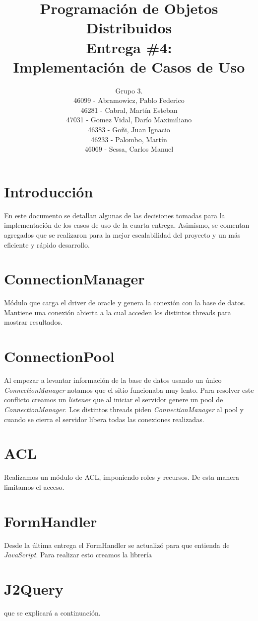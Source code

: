 \documentclass[a4paper,11pt]{article}
\title{
        Programación de Objetos Distribuidos \\
        Entrega \#4: \\
        Implementación de Casos de Uso
    }
\author{
        Grupo 3. \\
        46099 - Abramowicz, Pablo Federico \\
        46281 - Cabral, Martín Esteban \\
        47031 - Gomez Vidal, Darío Maximiliano \\
        46383 - Goñi, Juan Ignacio \\
        46233 - Palombo, Martín \\
        46069 - Sessa, Carlos Manuel
        }
\date{}
\begin{document}
\maketitle
\pagebreak

\section{Introducción}
En este documento se detallan algunas de las decisiones tomadas para la 
implementación de los casos de uso de la cuarta entrega.
Asimismo, se comentan agregados que se realizaron para la mejor
escalabilidad del proyecto y un más eficiente y rápido desarrollo.

\section{ConnectionManager}
Módulo que carga el driver de oracle y genera la conexión con la base de datos.
Mantiene una conexión abierta a la cual acceden los distintos threads para
mostrar resultados.

\section{ConnectionPool}
Al empezar a levantar información de la base de datos usando un único
\textit{ConnectionManager} notamos que el sitio funcionaba muy lento.
Para resolver este conflicto creamos un \textit{listener} que al iniciar el
servidor genere un pool de \textit{ConnectionManager}. Los distintos threads
piden \textit{ConnectionManager} al pool y cuando se cierra el servidor
libera todas las conexiones realizadas.

\section{ACL}
Realizamos un módulo de ACL, imponiendo roles y recursos.
De esta manera limitamos el acceso.

\section{FormHandler}
Desde la última entrega el FormHandler se actualizó para que entienda de
\textit{JavaScript}. Para realizar esto creamos la librería \section{J2Query}
que se explicará a continuación.
\end{document}
